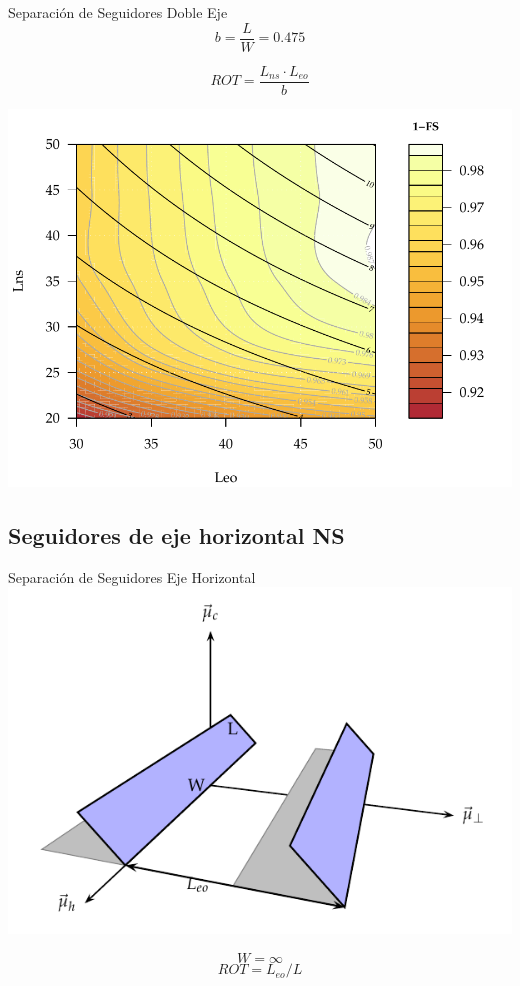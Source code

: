 \documentclass[xcolor={usenames,svgnames,dvipsnames}]{beamer}
\begin{document}
\begin{frame}[label=sec-2-3-2]{Separación de Seguidores Doble Eje}
$$b=\frac{L}{W}=0.475$$

$$ROT=\frac{L_{ns}\cdot L_{eo}}{b}$$

\includegraphics[width=.9\linewidth]{../figs/AbacoSeguidor2X_Ene10.pdf}
\end{frame}


\subsection{Seguidores de eje horizontal NS}
\label{sec-2-4}

\begin{frame}[label=sec-2-4-1]{Separación de Seguidores Eje Horizontal}
\includegraphics[width=.9\linewidth]{../figs/SombrasHoriz.pdf}

$$W=\infty$$ $$ROT=L_{eo}/L$$
\end{frame}
\end{document}
